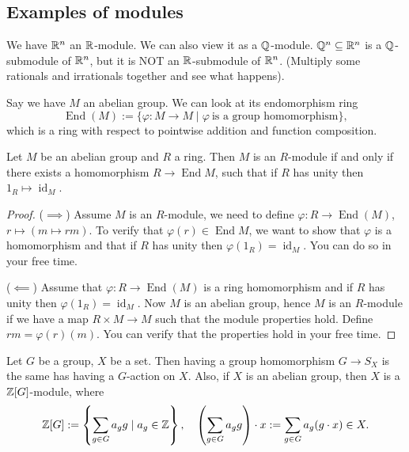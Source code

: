 \subsection{Examples of modules}
\begin{example}
    We have $\mathbb{R}^n $ an $\mathbb{R}$-module. We can also view it as a $\mathbb{Q}$-module. $\mathbb{Q}^n \subseteq \mathbb{R}^n  $ is a $\mathbb{Q}$-submodule of $\mathbb{R}^n $, but it is NOT an $\mathbb{R}$-submodule of $\mathbb{R}^n $. (Multiply some rationals and irrationals together and see what happens).
\end{example}
Say we have $M$ an abelian group. We can look at its endomorphism ring \[
    \operatorname{End}(M):= \{\varphi \colon M \to M  \mid \varphi \ \text{is a group homomorphism} \} ,
\] which is a ring with respect to pointwise addition and function composition.
\begin{prop}
    Let $M$ be an abelian group and $R$ a ring. Then $M$ is an $R$-module if and only if there exists a homomorphism $R\to \operatorname{End}M$, such that if $R$ has unity then $1_R\mapsto \operatorname{id}_M$.
\end{prop}
\begin{proof}
    ($\implies $) Assume $M$ is an $R$-module, we need to define $\varphi  \colon R \to \operatorname{End}(M)$, $r \mapsto (m \mapsto rm)$. To verify that $\varphi (r)\in \operatorname{End}M$, we want to show that $\varphi $ is a homomorphism and that if $R$ has unity then $\varphi (1_R)=\operatorname{id}_M$. You can do so in your free time.

    ($\impliedby $) Assume that $\varphi \colon R \to \operatorname{End}(M)$ is a ring homomorphism and if $R$ has unity then $\varphi (1_R)=\operatorname{id}_M$. Now $M$ is an abelian group, hence $M$ is an $R$-module if we have a map $R\times M \to M  $ such that the module properties hold. Define $rm=\varphi (r)(m)$. You can verify that the properties hold in your free time.
\end{proof}
\begin{example}
Let $G$ be a group, $X$ be a set. Then having a group homomorphism $G\to S_X$ is the same has having a $G$-action on $X$. Also, if $X$ is an abelian group, then $X$ is a $\mathbb{Z}[G]$-module, where \[
    \mathbb{Z}[G]:=\left\{\sum_{g\in G}^{} a_gg \mid a_g\in \mathbb{Z} \right\}, \quad 
    \left( \sum_{g\in G}^{} a_gg \right) \cdot x:= \sum_{g\in G}^{} a_g(g\cdot x)\in X.
    \] 
\end{example}
